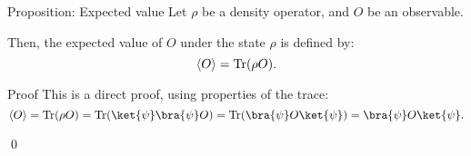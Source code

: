 \documentclass[a4paper]{article}
\begin{document}
\begin{parag}{Proposition: Expected value}
    Let $\rho$ be a density operator, and $O$ be an observable.

    Then, the expected value of $O$ under the state $\rho$ is defined by: 
    \[\left\langle O \right\rangle = \Tr\left(\rho O\right).\]

    \begin{subparag}{Proof}
         This is a direct proof, using properties of the trace:
        \[\left\langle O \right\rangle = \Tr\left(\rho O\right) = \Tr\left(\ket{\psi}\bra{\psi}O\right) = \Tr\left(\bra{\psi}O \ket{\psi}\right) = \bra{\psi}O \ket{\psi}.\]

        \qed
    \end{subparag}
\end{parag}
\end{document}
